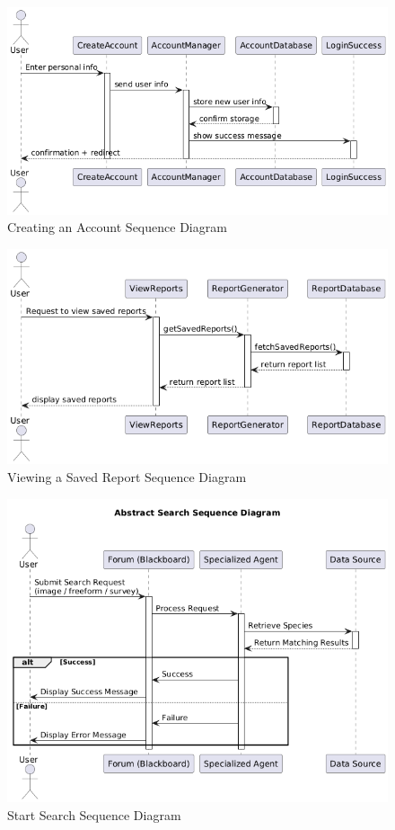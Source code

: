 \documentclass[]{article}
\numberwithin{figure}{section}
\begin{document}
\begin{figure}[h]
    \centering
    \includegraphics[scale=0.7]{CreateAccount_sequence.png}
    \caption{Creating an Account Sequence Diagram}
    \label{fig:CreateAccount_sequence}
\end{figure}
\clearpage

\begin{figure}[h]
    \centering
    \includegraphics[scale=0.7]{ViewSavedReports_sequence.png}
    \caption{Viewing a Saved Report Sequence Diagram}
    \label{fig:ViewSavedReports_sequence}
\end{figure}
\clearpage

\begin{figure}[h]
    \centering
    \includegraphics[scale=0.7]{StartSearch_sequence.png}
    \caption{Start Search Sequence Diagram}
    \label{fig:ViewSavedReports_sequence}
\end{figure}
\clearpage
\end{document}
